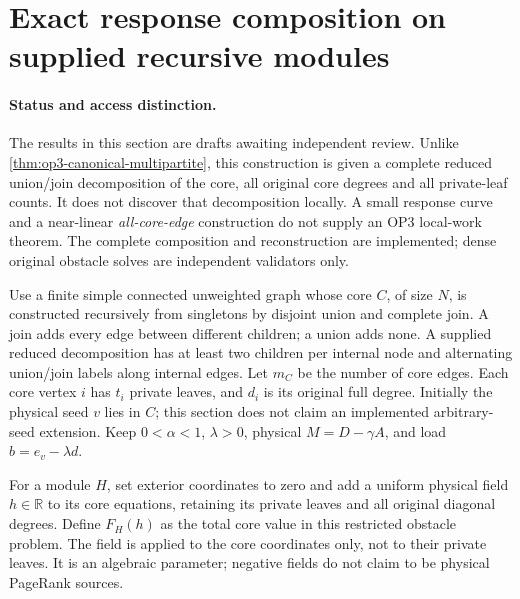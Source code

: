 \section[Supplied recursive module responses]{Exact response composition on supplied recursive modules}
\label{sec:op3-recursive-modules}

\paragraph{Status and access distinction.}
The results in this section are \statusproved{} drafts awaiting independent
review. Unlike \cref{thm:op3-canonical-multipartite}, this construction is
given a complete reduced union/join decomposition of the core, all original
core degrees and all private-leaf counts. It does not discover that
decomposition locally. A small response curve and a near-linear
\emph{all-core-edge} construction do not supply an OP3 local-work theorem.
The complete composition and reconstruction are implemented; dense original
obstacle solves are independent validators only.

Use a finite simple connected unweighted graph whose core $C$, of size
$N$, is constructed recursively from singletons by disjoint union and
complete join. A join adds every edge between different children; a union
adds none. A supplied reduced decomposition has at least two children per
internal node and alternating union/join labels along internal edges.
Let $m_C$ be the number of core edges. Each core vertex $i$ has $t_i$
private leaves, and $d_i$ is its original full degree. Initially the
physical seed $v$ lies in $C$; this section does not claim an implemented
arbitrary-seed extension. Keep $0<\alpha<1$, $\lambda>0$, physical
$M=D-\gamma A$, and load $b=e_v-\lambda d$.

For a module $H$, set exterior coordinates to zero and add a uniform
physical field $h\in\mathbb R$ to its core equations, retaining its private
leaves and all original diagonal degrees. Define $F_H(h)$ as the total
core value in this restricted obstacle problem. The field is applied to
the core coordinates only, not to their private leaves. It is an algebraic
parameter; negative fields do not claim to be physical PageRank sources.

